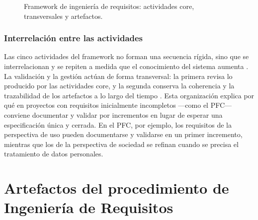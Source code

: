 \documentclass[onecolumn,12pt,a4paper]{IEEEtran}
\begin{document}
\begin{figure}[htbp]
\centering
{}
\caption{Framework de ingenier\'ia de requisitos: actividades core, transversales y artefactos.}
\label{fig:framework}
\end{figure}

\subsubsection{Interrelaci\'on entre las actividades}
Las cinco actividades del framework no forman una secuencia r\'igida, sino que se interrelacionan y se repiten a medida que el conocimiento del sistema aumenta \cite{pohl2025}. La validaci\'on y la gesti\'on act\'uan de forma transversal: la primera revisa lo producido por las actividades core, y la segunda conserva la coherencia y la trazabilidad de los artefactos a lo largo del tiempo \cite{pohl2025,iso29148}. Esta organizaci\'on explica por qu\'e en proyectos con requisitos inicialmente incompletos ---como el PFC--- conviene documentar y validar por incrementos en lugar de esperar una especificaci\'on \'unica y cerrada. En el PFC, por ejemplo, los requisitos de la perspectiva de uso pueden documentarse y validarse en un primer incremento, mientras que los de la perspectiva de sociedad se refinan cuando se precisa el tratamiento de datos personales.

\setcounter{section}{2}
\section{Artefactos del procedimiento de Ingeniería de Requisitos}
\end{document}
